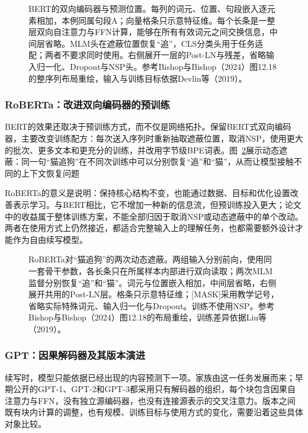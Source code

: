 \begin{figure}[p]
  \centering
  
  \caption{BERT的双向编码器与预测位置。每列的词元、位置、句段嵌入逐元素相加，本例同属句段A；向量格条只示意特征维。每个长条是一整层双向自注意力与FFN计算，能够在所有有效词元之间交换信息，中间层省略。MLM头在遮蔽位置恢复“追”，CLS分类头用于任务适配；两者不要求同时使用。右侧展开一层的Post-LN与残差，省略输入归一化、Dropout与NSP头。参考Bishop与Bishop（2024）图12.18的整序列布局重绘，输入与训练目标依据Devlin等（2019）。}
  \label{fig:transformer-architecture-bert}
\end{figure}
\FloatBarrier

\subsubsection{RoBERTa：改进双向编码器的预训练}

BERT的效果还取决于预训练方式，而不仅是网络拓扑。保留BERT式双向编码器，主要改变训练配方：每次送入序列时重新抽取遮蔽位置，取消NSP，使用更大的批次、更多文本和更充分的训练，并改用字节级BPE词表。图~\ref{fig:transformer-architecture-roberta}展示动态遮蔽：同一句“猫追狗”在不同次训练中可以分别恢复“追”和“猫”，从而让模型接触不同的上下文恢复问题

RoBERTa的意义是说明：保持核心结构不变，也能通过数据、目标和优化设置改善表示学习。与BERT相比，它不增加一种新的信息流，但预训练投入更大；论文中的收益属于整体训练方案，不能全部归因于取消NSP或动态遮蔽中的单个改动。两者在使用方式上仍然接近，都适合完整输入上的理解任务，也都需要额外设计才能作为自由续写模型。

\begin{figure}[p]
  \centering
  
  \caption{RoBERTa对“猫追狗”的两次动态遮蔽。两组输入分别前向，使用同一套骨干参数，各长条只在所属样本内部进行双向读取；两次MLM监督分别恢复“追”和“猫”。词元与位置嵌入相加，中间层省略，右侧展开共用的Post-LN层。格条只示意特征维；[MASK]采用教学记号，省略实际特殊词元、输入归一化与Dropout。训练不使用NSP。参考Bishop与Bishop（2024）图12.18的布局重绘，训练差异依据Liu等（2019）。}
  \label{fig:transformer-architecture-roberta}
\end{figure}
\FloatBarrier

\subsubsection{GPT：因果解码器及其版本演进}

续写时，模型只能依据已经出现的内容预测下一项。家族由这一任务发展而来；早期公开的GPT-1、GPT-2和GPT-3都采用只有解码器的组织，每个块包含因果自注意力与FFN，没有独立源编码器，也没有连接源表示的交叉注意力。版本之间既有块内计算的调整，也有规模、训练目标与使用方式的变化，需要沿着这些具体对象比较。

